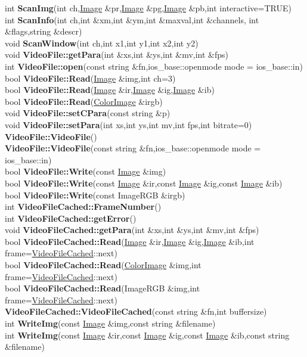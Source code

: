 \documentclass[10pt,titlepage]{article}
\def\functionlistentry#1#2#3#4#5#6{\noindent #1 {\bf #2}(#3) \dotfill #6\\}
\begin{document}
{{\functionlistentry{int}{ScanImg}{int ch,\hyperlink{Image}{Image} \&pr,\hyperlink{Image}{Image} \&pg,\hyperlink{Image}{Image} \&pb,int interactive=TRUE}{149}{imageio}{}
\functionlistentry{int}{ScanInfo}{int ch,int \&xm,int \&ym,int \&maxval,int \&channels, int \&flags,string \&descr}{150}{imageio}{}
\functionlistentry{void}{ScanWindow}{int ch,int x1,int y1,int x2,int y2}{147}{imageio}{}
\functionlistentry{void}{VideoFile::getPara}{int \&xs,int \&ys,int \&mv,int \&fps}{122}{imageio}{}
\functionlistentry{int}{VideoFile::open}{const string \&fn,ios\_base::openmode mode = ios\_base::in}{121}{imageio}{}
\functionlistentry{bool}{VideoFile::Read}{\hyperlink{Image}{Image} \&img,int ch=3}{125}{imageio}{}
\functionlistentry{bool}{VideoFile::Read}{\hyperlink{Image}{Image} \&ir,\hyperlink{Image}{Image} \&ig,\hyperlink{Image}{Image} \&ib}{126}{imageio}{}
\functionlistentry{bool}{VideoFile::Read}{\hyperlink{ColorImage}{ColorImage} \&irgb}{127}{imageio}{}
\functionlistentry{void}{VideoFile::setCPara}{const string \&p}{124}{imageio}{}
\functionlistentry{void}{VideoFile::setPara}{int xs,int ys,int mv,int fps,int bitrate=0}{123}{imageio}{}
\functionlistentry{}{VideoFile::VideoFile}{}{119}{imageio}{}
\functionlistentry{}{VideoFile::VideoFile}{const string \&fn,ios\_base::openmode mode = ios\_base::in}{120}{imageio}{}
\functionlistentry{bool}{VideoFile::Write}{const \hyperlink{Image}{Image} \&img}{128}{imageio}{}
\functionlistentry{bool}{VideoFile::Write}{const \hyperlink{Image}{Image} \&ir,const \hyperlink{Image}{Image} \&ig,const \hyperlink{Image}{Image} \&ib}{129}{imageio}{}
\functionlistentry{bool}{VideoFile::Write}{const ImageRGB \&irgb}{130}{imageio}{}
\functionlistentry{int}{VideoFileCached::FrameNumber}{}{145}{imageio}{}
\functionlistentry{int}{VideoFileCached::getError}{}{146}{imageio}{}
\functionlistentry{void}{VideoFileCached::getPara}{int \&xs,int \&ys,int \&mv,int \&fps}{141}{imageio}{}
\functionlistentry{bool}{VideoFileCached::Read}{\hyperlink{Image}{Image} \&ir,\hyperlink{Image}{Image} \&ig,\hyperlink{Image}{Image} \&ib,int frame=\hyperlink{VideoFileCached}{VideoFileCached}::next}{142}{imageio}{}
\functionlistentry{bool}{VideoFileCached::Read}{\hyperlink{ColorImage}{ColorImage} \&img,int frame=\hyperlink{VideoFileCached}{VideoFileCached}::next}{143}{imageio}{}
\functionlistentry{bool}{VideoFileCached::Read}{ImageRGB \&img,int frame=\hyperlink{VideoFileCached}{VideoFileCached}::next}{144}{imageio}{}
\functionlistentry{}{VideoFileCached::VideoFileCached}{const string \&fn,int buffersize}{140}{imageio}{}
\functionlistentry{int}{WriteImg}{const \hyperlink{Image}{Image} \&img,const string \&filename}{114}{imageio}{}
\functionlistentry{int}{WriteImg}{const \hyperlink{Image}{Image} \&ir,const \hyperlink{Image}{Image} \&ig,const \hyperlink{Image}{Image} \&ib,const string \&filename}{116}{imageio}{}

}}
\end{document}

